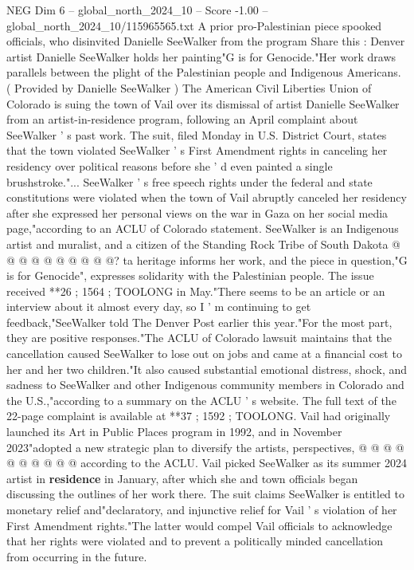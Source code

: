 \begin{textsample}{NEG Dim 6 – global\_north\_2024\_10 – Score -1.00 – global\_north\_2024\_10/115965565.txt}  \label{ex:f6_neg_085}
A prior pro-Palestinian piece spooked officials, who disinvited Danielle SeeWalker from the program Share this : Denver artist Danielle SeeWalker holds her painting"G is for Genocide."Her work draws parallels between the plight of the Palestinian people and Indigenous Americans. ( Provided by Danielle SeeWalker ) The American Civil Liberties Union of Colorado is suing the town of Vail over its dismissal of artist Danielle SeeWalker from an artist-in-residence program, following an April complaint about SeeWalker ' s past work.
The suit, filed Monday in U.S.
District Court, states that the town violated SeeWalker ' s First Amendment rights in canceling her residency over political reasons before she ' d even painted a single brushstroke."...
SeeWalker ' s free speech rights under the federal and state constitutions were violated when the town of Vail abruptly canceled her residency after she expressed her personal views on the war in Gaza on her social media page,"according to an ACLU of Colorado statement.
SeeWalker is an Indigenous artist and muralist, and a citizen of the Standing Rock Tribe of South Dakota @ @ @ @ @ @ @ @ @ @? ta heritage informs her work, and the piece in question,"G is for Genocide", expresses solidarity with the Palestinian people.
The issue received **26 ; 1564 ; TOOLONG in May."There seems to be an article or an interview about it almost every day, so I ' m continuing to get feedback,"SeeWalker told The Denver Post earlier this year."For the most part, they are positive responses."The ACLU of Colorado lawsuit maintains that the cancellation caused SeeWalker to lose out on jobs and came at a financial cost to her and her two children."It also caused substantial emotional distress, shock, and sadness to SeeWalker and other Indigenous community members in Colorado and the U.S.,"according to a summary on the ACLU ' s website.
The full text of the 22-page complaint is available at **37 ; 1592 ; TOOLONG.
Vail had originally launched its Art in Public Places program in 1992, and in November 2023"adopted a new strategic plan to diversify the artists, perspectives, @ @ @ @ @ @ @ @ @ @ according to the ACLU.
Vail picked SeeWalker as its summer 2024 artist in \textbf{residence} in January, after which she and town officials began discussing the outlines of her work there.
The suit claims SeeWalker is entitled to monetary relief and"declaratory, and injunctive relief for Vail ' s violation of her First Amendment rights."The latter would compel Vail officials to acknowledge that her rights were violated and to prevent a politically minded cancellation from occurring in the future.

\end{textsample}
